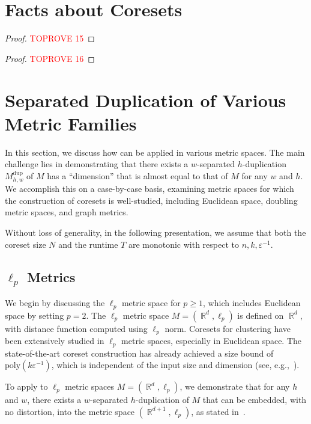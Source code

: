 \documentclass[letterpaper,11pt]{article}
\theoremstyle{plain}
\theoremstyle{definition}
\theoremstyle{remark}
\DeclareMathOperator{\R}{\mathbb{R}}
\newcommand{\dup}{\mathrm{dup}}
\newcommand{\eps}{\varepsilon}
\begin{document}
\begin{appendices}
     \appendixpage
     \section{Facts about Coresets}
\label{sec:composability}
\ComposabilityCoresets*

\begin{proof}\textcolor{red}{TOPROVE 15}\end{proof}

\ASufficientCondition*
\begin{proof}\textcolor{red}{TOPROVE 16}\end{proof}

      \section{Separated Duplication of Various Metric Families}
\label{sec:application}
In this section, we discuss how  can be applied in various metric spaces. The main challenge lies in demonstrating that there exists a $w$-separated $h$-duplication $M^\dup_{h,w}$ of $M$ has a ``dimension'' that is almost equal to that of $M$ for any $w$ and $h$. We accomplish this on a case-by-case basis, examining metric spaces for which the construction of coresets is well-studied, including Euclidean space, doubling metric spaces, and graph metrics.

Without loss of generality, in the following presentation, we assume that both the coreset size $N$ and the runtime $T$ are monotonic with respect to $n,k,\eps^{-1}$.


\subsection{$\ell_p$ Metrics}

We begin by discussing the $\ell_p$ metric space for $p\ge 1$, which includes Euclidean space by setting $p=2$. The $\ell_p$ metric space $M=(\R^d, \ell_p)$ is defined on $\R^d$, with distance function computed using $\ell_p$ norm. 
Coresets for clustering have been extensively studied in $\ell_p$ metric spaces, especially in Euclidean space. The state-of-the-art coreset construction has already achieved a size bound of $\text{poly}(k\eps^{-1})$, which is independent of the input size and dimension (see, e.g.,~\cite{Cohen-addad2021New}). 

To apply  to $\ell_p$ metric spaces $M=(\R^d, \ell_p)$, we demonstrate that for any $h$ and $w$, there exists a $w$-separated $h$-duplication of $M$ that can be embedded, with no distortion, into the metric space $(\R^{d+1}, \ell_p)$, as stated in~. 



\end{appendices}
\end{document}
